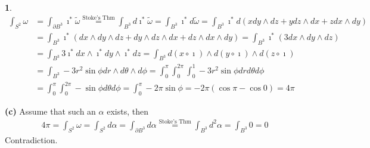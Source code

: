 \documentclass[10.5pt]{article}
\theoremstyle{definition}
\newtheorem{pb}{}
\newcommand{\z}{\imath}
\begin{document}
\begin{pb}
        \begin{align*}
            \int_{S^2} \omega &= \int_{\partial B^3} \z^* \tilde{\omega} \overset{\text{Stoke's Thm}}{=} \int_{B^3} d\z^*{\tilde{\omega}} = \int_{B^3} \z^* d \tilde{\omega} = \int_{B^3} \z^*d(x dy \wedge dz + y dz \wedge dx + z dx \wedge dy) \\
            &= \int_{B^3} \z^* (dx \wedge dy \wedge dz + dy \wedge dz \wedge dx + dz \wedge dx \wedge dy) = \int_{B^3} \z^*(3dx \wedge dy \wedge dz) \\
            &= \int_{B^3} 3 \z^*dx \wedge \z^*dy \wedge \z^* dz 
            = \int_{B^3} d(x \circ \z) \wedge d(y \circ \z) \wedge d(z \circ \z) \\
            &= \int_{B^3} -3r^2\sin\phi dr \wedge d\theta \wedge d\phi = \int_0^{\pi}\int_0^{2\pi}\int_0^1 -3r^2\sin\phi dr d\theta d\phi \\
            &= \int_0^{\pi}\int_0^{2\pi}-\sin\phi d\theta d\phi = \int_0^\pi-2\pi \sin\phi
            = -2\pi \left(\cos\pi - \cos0\right) = 4\pi
        \end{align*}

        \textbf{(c)} Assume that such an \(\alpha\) exists, then
        \begin{align*}
            4\pi = \int_{S^2} \omega = \int_{S^2}d \alpha = \int_{\partial B^3}d \alpha \overset{\text{Stoke's Thm}}{=} \int_{B^3} d^2 \alpha = \int_{B^3} 0 = 0
        \end{align*}
        Contradiction.
    \end{pb}
\end{document}
